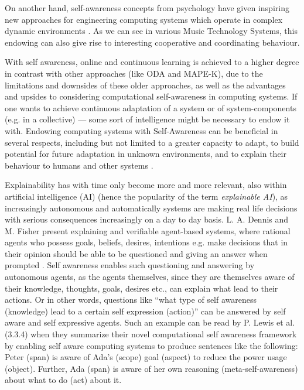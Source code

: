 On another hand, self-awareness concepts from psychology have given inspiring new approaches for engineering computing systems which operate in complex dynamic environments \cite{sacs16_ch2}. As we can see in various Music Technology Systems, this endowing can also give rise to interesting cooperative and coordinating behaviour.

With self awareness, online and continuous learning is achieved to a higher degree in contrast with other approaches (like ODA and MAPE-K), due to the limitations and downsides of these older approaches, as well as the advantages and upsides to considering computational self-awareness in computing systems. If one wants to achieve continuous adaptation of a system or of system-components (e.g. in a collective) — some sort of intelligence might be necessary to endow it with. Endowing computing systems with Self-Awareness can be beneficial in several respects, including but not limited to a greater capacity to adapt, to build potential for future adaptation in unknown environments, and to explain their behaviour to humans and other systems \cite{sacs17_ch3}.

Explainability has with time only become more and more relevant, also within artificial intelligence (AI) (hence the popularity of the term \textit{explainable AI}), as increasingly autonomous and automatically systems are making real life decisions with serious consequences increasingly on a day to day basis. L. A. Dennis and M. Fisher present explaining and verifiable agent-based systems, where rational agents who possess goals, beliefs, desires, intentions e.g. make decisions that in their opinion should be able to be questioned and giving an answer when prompted \cite{verifiable_and_questionable_agents}. Self awareness enables such questioning and answering by autonomous agents, as the agents themselves, since they are themselves aware of their knowledge, thoughts, goals, desires etc., can explain what lead to their actions. Or in other words, questions like ``what type of self awareness \cite{sacs16_ch2} (knowledge) lead to a certain self expression \cite{sacs16_ch2} (action)'' can be answered by self aware and self expressive agents. Such an example can be read by P. Lewis et al. \cite{sacs17_ch3} (3.3.4) when they summarize their novel computational self awareness framework by enabling self aware computing systems to produce sentences like the following: Peter (span) is aware of Ada's (scope) goal (aspect) to reduce the power usage (object). Further, Ada (span) is aware of her own reasoning (meta-self-awareness) about what to do (act) about it.

